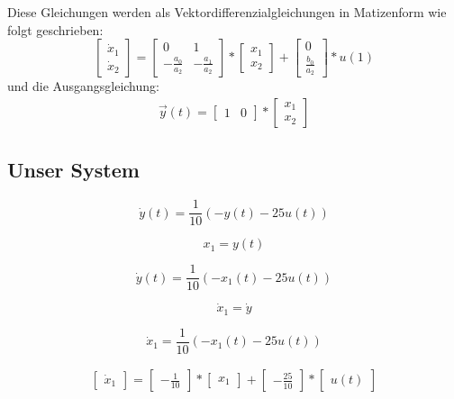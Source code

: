 Diese Gleichungen werden als Vektordifferenzialgleichungen in Matizenform wie folgt geschrieben:
\[
  \begin{bmatrix}
    \dot x_1\\
    \dot x_2
  \end{bmatrix}
   =
  \begin{bmatrix}
     0                  & 1             \\
     -\frac{a_0}{a_2}   & -\frac{a_1}{a_2}
  \end{bmatrix}
  *
  \begin{bmatrix}
    x_1  \\
    x_2
  \end{bmatrix}
  +
  \begin{bmatrix}
    0               \\
    \frac{b_0}{a_2}
  \end{bmatrix}
  *u(1)
\]
 und die Ausgangsgleichung:
\begin{align*}
  \vec y(t) =
  \begin{bmatrix}
    1     & 0
  \end{bmatrix}
  *
  \begin{bmatrix}
    x_1     \\
    x_2
  \end{bmatrix}
\end{align*}

\subsection*{Unser System}

\begin{equation*}
  \dot y(t)= \frac{1}{10}(-y(t)-25u(t))
\end{equation*}

\begin{equation*}
  x_1 =y(t)
\end{equation*}

\begin{equation*}
  \dot y(t)= \frac{1}{10}(-x_1(t)-25u(t))
\end{equation*}

\begin{equation*}
  \dot x_1 = \dot y
\end{equation*}

\begin{equation*}
  \dot x_1= \frac{1}{10}(-x_1(t)-25u(t))
\end{equation*}

\begin{align*}
  \begin{bmatrix}
    \dot x_1
  \end{bmatrix}
  =
  \begin{bmatrix}
    -\frac{1}{10}
  \end{bmatrix}
  *
  \begin{bmatrix}
    x_1
  \end{bmatrix}
  +
  \begin{bmatrix}
    -\frac{25}{10}
  \end{bmatrix}
  *
  \begin{bmatrix}
    u(t)
  \end{bmatrix}
\end{align*}


